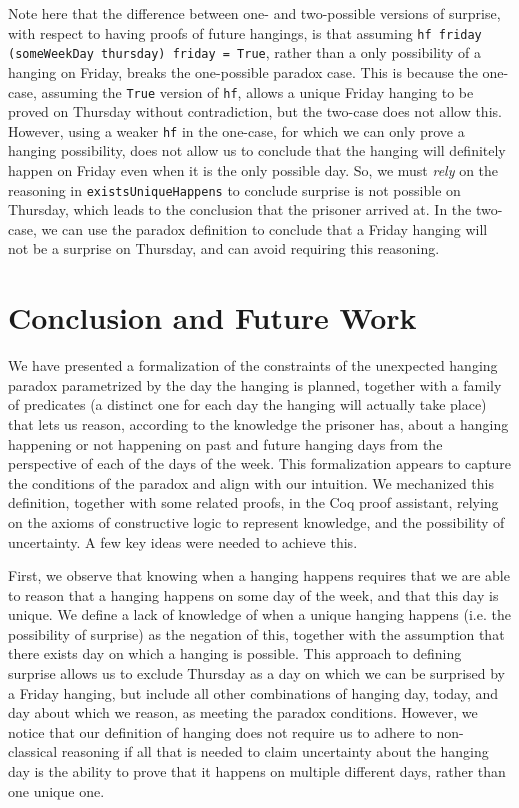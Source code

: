 \documentclass[runningheads]{llncs}
\begin{document}
Note here that
the difference between one- and two-possible versions of surprise, with respect
to having proofs of future hangings, is that assuming
{\tt hf friday (someWeekDay thursday) friday = True}, rather than a only
possibility of a hanging on Friday, breaks the one-possible paradox case.
This is because the one-case, assuming the {\tt True} version of {\tt hf},
allows a unique Friday hanging to be proved on Thursday without contradiction, but
the two-case does not allow this. However, using a weaker {\tt hf} in the one-case, for which
we can only prove a hanging possibility, does not allow us to conclude that
the hanging will definitely happen on Friday even when it is the only possible day.
So, we must \emph{rely} on the reasoning in
{\tt existsUniqueHappens} to conclude surprise is not possible on Thursday,
which leads to the conclusion that the prisoner arrived at.
In the two-case, we can use the paradox definition to conclude that a Friday
hanging will not be a surprise on Thursday, and can avoid requiring this reasoning.

\section{Conclusion and Future Work}

We have presented a formalization of the constraints of the unexpected hanging paradox
parametrized by the day the hanging is planned,
together with a family of predicates (a distinct one for each day the hanging
will actually take place) that lets us reason, according to the knowledge the prisoner has,
about a hanging happening or not happening on
past and future hanging days from the perspective of each of the days of the week.
This formalization appears to capture the
conditions of the paradox and align with our intuition.
We mechanized this definition, together with some related proofs, in the Coq
proof assistant, relying on the axioms of constructive logic to represent knowledge,
and the possibility of uncertainty.
A few key ideas were needed to achieve this.

First, we observe that knowing when a hanging happens requires that we are able to
reason that a hanging happens on some day of the week, and that this day is unique.
We define a lack of knowledge of when a unique hanging happens (i.e. the possibility of surprise)
as the negation of this,
together with the assumption that there exists day on which a hanging is possible.
This approach to defining surprise allows us to exclude Thursday
as a day on which we can be surprised by a Friday hanging, but include all other
combinations of hanging day, today, and day about which we reason, as meeting
the paradox conditions. However, we notice that
our definition of hanging does not require us to adhere to non-classical
reasoning if all that is needed to claim uncertainty about the hanging day
is the ability to prove that it happens on multiple different days, rather than one unique one.
\end{document}
